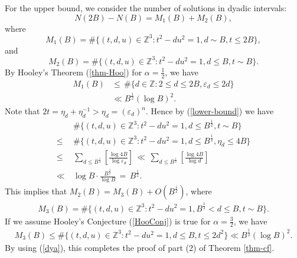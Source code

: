 \documentclass[reqno, 11pt, twoside]{amsart}
\numberwithin{equation}{section}
\theoremstyle{definition}
\renewcommand{\leq}{\leqslant}
\newcommand{\eps}{\varepsilon}
\newcommand{\ZZ}{\mathbb{Z}}
\begin{document}
        For the upper bound, we consider the number of solutions in dyadic intervals:
        \begin{equation}\label{dya}
            N(2B) - N(B) = M_1(B) + M_2(B),
        \end{equation}
        where
        \begin{equation*}
            M_1(B) = \# \{ (t,d,u) \in \ZZ^3: t^2 - du^2 = 1, d \sim B, t \leq 2B \},
        \end{equation*}
        and
        \begin{equation*}
            M_2(B) = \# \{ (t,d,u) \in \ZZ^3: t^2 - du^2 = 1, d \leq B, t \sim B \}.
        \end{equation*}
        By Hooley's Theorem (\ref{thm-Hoo}) for $\alpha = \frac{1}{2}$, we have 
        \begin{align}
        	M_1(B) & \leq \, \# \{ d \in \ZZ: 2 \leq d \leq 2B, \eps_d \leq 2d \} \\
            & \ll B^{\frac{1}{2}} (\log B)^2.
        \end{align}
        Note that $2t = \eta_d + \eta_d^{-1} > \eta_d = (\eps_d)^n$. Hence by (\ref{lower-bound}) we have
        \begin{align*}
        	& \ \#\{ (t,d,u) \in \ZZ^3: t^2 - du^2 = 1, d \leq B^{\frac{1}{2}}, t \sim B\} \\
        	 \leq & \ \#\{ (t,d,u) \in \ZZ^3: t^2 - du^2 = 1, d \leq B^{\frac{1}{2}}, \eta_d \leq 4B \} \\
        	 \leq & \ \sum_{d \leq B^{\frac{1}{2}}} \left[ \frac{\log 4B}{\log \eps_d} \right] \, \ll \, \sum_{d \leq B^{\frac{1}{2}}} \left[ \frac{\log 4B}{\log d} \right] \\
        	 \ll & \ \log B \cdot \frac{B^{\frac{1}{2}}}{\log B} \, = \, B^{\frac{1}{2}}. 
        \end{align*}
        This implies that $M_2(B) = M_3(B) + O(B^{\frac{1}{2}})$, where
        \begin{eqnarray*}
        	M_3(B) =  \#\{ (t,d,u) \in \ZZ^3: t^2 - du^2 = 1, B^{\frac{1}{2}} < d \leq B, t \sim B \}.
        \end{eqnarray*}    
        If we assume Hooley's Conjecture (\ref{HooConj}) is true for $\alpha = \frac{3}{2}$, we have 
        \begin{eqnarray*}
        	M_3(B) \leq  \#\{ (t,d,u) \in \ZZ^3: t^2 - du^2 = 1, d \leq B, t \leq 2d^2 \} \ll B^{\frac{1}{2}} (\log B)^2.
        \end{eqnarray*}
        By using (\ref{dya}), this completes the proof of part (2) of Theorem \ref{thm-cf}.
\end{document}
